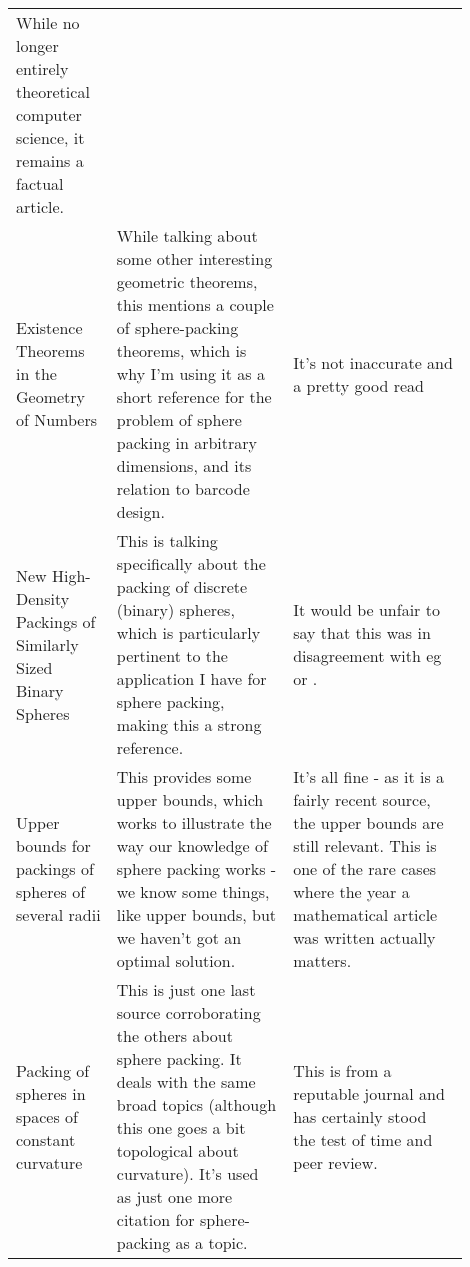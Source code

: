 \documentclass[a4paper,11pt]{article}
\begin{document}
\begin{center}
{\begin{longtable}{p{0.2\linewidth} p{0.35\linewidth} p{0.35\linewidth}}
    While no longer entirely theoretical computer science, it remains a factual
    article.

    \\

    Existence Theorems in the Geometry of Numbers
    \cite{SphereTheorems1947Rogers} &

    While talking about some other interesting geometric theorems, this mentions
    a couple of sphere-packing theorems, which is why I'm using it as a short
    reference for the problem of sphere packing in arbitrary dimensions, and its
    relation to barcode design. &

    It's not inaccurate and a pretty good read

    \\

    New High-Density Packings of Similarly Sized Binary Spheres
    \cite{HighDensityPackings2011OToole} &

    This is talking specifically about the packing of discrete (binary) spheres,
    which is particularly pertinent to the application I have for sphere
    packing, making this a strong reference. &

    It would be unfair to say that this was in disagreement with eg
    \cite{PackingCurvature1978Boroczky} or \cite{SphereUpperBounds2014DeLaat}.

    \\

    Upper bounds for packings of spheres of several radii
    \cite{SphereUpperBounds2014DeLaat} &

    This provides some upper bounds, which works to illustrate the way our
    knowledge of sphere packing works - we know some things, like upper bounds,
    but we haven't got an optimal solution. &

    It's all fine - as it is a fairly recent source, the upper bounds are still
    relevant. This is one of the rare cases where the year a mathematical
    article was written actually matters.

    \\

    Packing of spheres in spaces of constant curvature
    \cite{PackingCurvature1978Boroczky} &

    This is just one last source corroborating the others about sphere packing.
    It deals with the same broad topics (although this one goes a bit
    topological about curvature). It's used as just one more citation for
    sphere-packing as a topic. &

    This is from a reputable journal and has certainly stood the test of time
    and peer review.

    \\

    \bottomrule
    \end{longtable}
    }
    \end{center}



\end{document}
